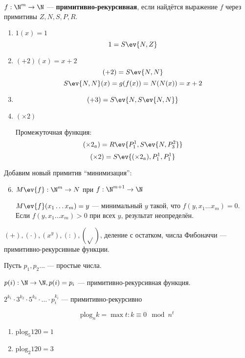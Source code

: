 \begin{definition}
    \(f : \N^m \to \N\) --- \textbf{примитивно-рекурсивная}, если найдётся выражение \(f \) через примитивы \(Z, N, S, P, R\).
\end{definition}

\begin{example}\itemfix
    \begin{enumerate}
        \item \(1(x) = 1\)
              \[1 = S\ev{N, Z}\]
        \item \(( + 2)(x) = x + 2\)
              \[( + 2) = S\ev{N, N}\]
              \[S\ev{N, N}(x) = g(f(x)) = N(N(x)) = x + 2\]
        \item \[( + 3) = S\ev{N, S\ev{N, N}}\]
        \item \(( \times 2)\)

              Промежуточная функция:
              \[( \times 2_a) = R\ev{P_1^1, S\ev{N, P_3^2}}\]
              \[( \times 2) = S\ev{( \times 2_a), P_1^1, P_1^1}\]
    \end{enumerate}
\end{example}

Добавим новый примитив ``минимизация'':
\begin{enumerate}
    \setcounter{enumi}{5}
    \item \(M\ev{f} : \N^m \to N\) при \(f : \N^{m + 1} \to \N\)

          \(M\ev{f}(x_1 \dots x_m) = y\) --- минимальный \(y\) такой, что \(f(y, x_1 \dots x_m) = 0\). Если \(f(y, x_1 \dots x_m) > 0\) при всех \(y\), результат неопределён.
\end{enumerate}

\begin{theorem}
    \(( +), (\cdot), (x^y), (:), (\sqrt{})\), деление с остатком, числа Фибоначчи --- примитивно-рекурсивные функции.
\end{theorem}

Пусть \(p_1, p_2 \dots \) --- простые числа.

\begin{statement}
    \(p(i) : \N \to \N, p(i) = p_i\) --- примитивно-рекурсивная функция.
\end{statement}

\(2^{k_1} \cdot 3^{k_2} \cdot 5^{k_3} \cdot \ldots \cdot p_i^{k_i}\) --- примитивно-рекурсивно

\[\text{plog}_n k = \max t : k \equiv 0 \mod n^t\]
\begin{example}\itemfix
    \begin{enumerate}
        \item \(\text{plog}_5 120 = 1\)
        \item \(\text{plog}_2 120 = 3\)
    \end{enumerate}
\end{example}

